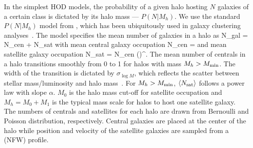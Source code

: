In the simplest HOD models, the probability of a given halo hosting $N$ galaxies 
of a certain class is dictated by its halo mass --- $P(N|M_h)$.%
We use the standard $P(N|M_h)$ model from \cite{zheng2007}, which has been 
ubiquitously used in galaxy clustering analyses~\citep[\emph{e.g.}][]{sinha2018}. 
The model specifies the mean number of galaxies in a halo as
\beq
\langle N_{\rm gal} \rangle = \langle N_{\rm cen} \rangle + \langle N_{\rm sat} \rangle
\eeq
with mean central galaxy occupation
\beq \label{eq:Ncen}
\langle N_{\rm cen} \rangle  = 
\eeq
and mean satellite galaxy occupation
\beq \label{eq:Nsat}
\langle N_{\rm sat} \rangle = \langle N_{\rm cen} \rangle \bigg(\bigg)^\alpha.
\eeq
The mean number of centrals in a halo transitions smoothly from 0 to 1 for halos 
with mass $M_h > M_{\rm min}$. The width of the transition is dictated by 
$\sigma_{\log M}$, which reflects the scatter between stellar mass/luminosity and 
halo mass~\citep{citecite}. For $M_h > M_{\rm min}$, 
$\langle N_{\rm sat} \rangle$ follows a power law with slope $\alpha$. $M_0$ 
is the halo mass cut-off for satellite occupation and $M_h = M_0 + M_1$ is 
the typical mass scale for halos to host one satellite galaxy. The numbers 
of centrals and satellites for each halo are drawn from Bernoulli and Poisson 
distribution, respectively. Central galaxies are placed at the center of the
halo while position and velocity of the satellite galaxies are sampled from a 
\cite{navarro1997} (NFW) profile. 


